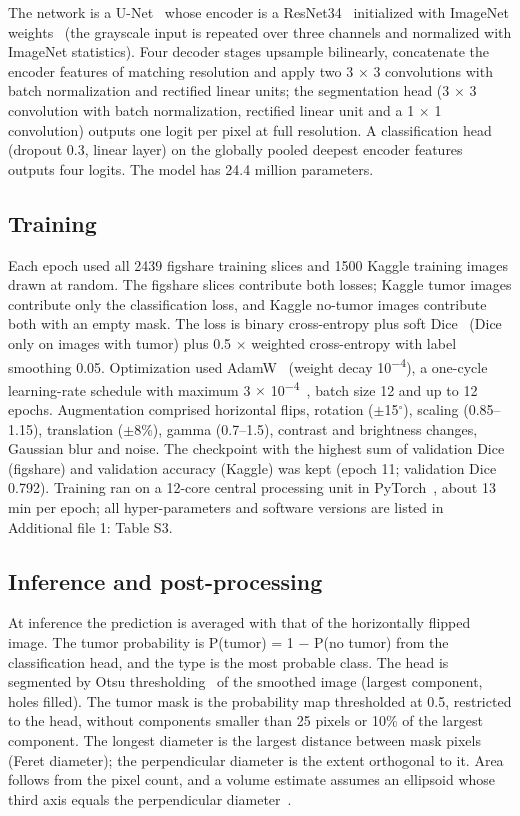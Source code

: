 \documentclass[pdflatex,sn-vancouver-num,iicol]{sn-jnl}
\begin{document}
The network is a U-Net~\cite{ronneberger2015} whose encoder is a ResNet34~\cite{he2016resnet} initialized with ImageNet weights~\cite{deng2009imagenet} (the grayscale input is repeated over three channels and normalized with ImageNet statistics). Four decoder stages upsample bilinearly, concatenate the encoder features of matching resolution and apply two 3 $\times$ 3 convolutions with batch normalization and rectified linear units; the segmentation head (3 $\times$ 3 convolution with batch normalization, rectified linear unit and a 1 $\times$ 1 convolution) outputs one logit per pixel at full resolution. A classification head (dropout 0.3, linear layer) on the globally pooled deepest encoder features outputs four logits. The model has 24.4 million parameters.

\subsection{Training}

Each epoch used all 2439 figshare training slices and 1500 Kaggle training images drawn at random. The figshare slices contribute both losses; Kaggle tumor images contribute only the classification loss, and Kaggle no-tumor images contribute both with an empty mask. The loss is binary cross-entropy plus soft Dice~\cite{milletari2016vnet} (Dice only on images with tumor) plus 0.5 $\times$ weighted cross-entropy with label smoothing 0.05. Optimization used AdamW~\cite{loshchilov2019adamw} (weight decay 10\textsuperscript{$-$4}), a one-cycle learning-rate schedule with maximum 3 $\times$ 10\textsuperscript{$-$4}~\cite{smith2019onecycle}, batch size 12 and up to 12 epochs. Augmentation comprised horizontal flips, rotation ($\pm$15$^\circ$), scaling (0.85--1.15), translation ($\pm$8\%), gamma (0.7--1.5), contrast and brightness changes, Gaussian blur and noise. The checkpoint with the highest sum of validation Dice (figshare) and validation accuracy (Kaggle) was kept (epoch 11; validation Dice 0.792). Training ran on a 12-core central processing unit in PyTorch~\cite{paszke2019pytorch}, about 13 min per epoch; all hyper-parameters and software versions are listed in Additional file 1: Table S3.

\subsection{Inference and post-processing}

At inference the prediction is averaged with that of the horizontally flipped image. The tumor probability is P(tumor) = 1 $-$ P(no tumor) from the classification head, and the type is the most probable class. The head is segmented by Otsu thresholding~\cite{otsu1979} of the smoothed image (largest component, holes filled). The tumor mask is the probability map thresholded at 0.5, restricted to the head, without components smaller than 25 pixels or 10\% of the largest component. The longest diameter is the largest distance between mask pixels (Feret diameter); the perpendicular diameter is the extent orthogonal to it. Area follows from the pixel count, and a volume estimate assumes an ellipsoid whose third axis equals the perpendicular diameter~\cite{kothari1996}.
\end{document}

